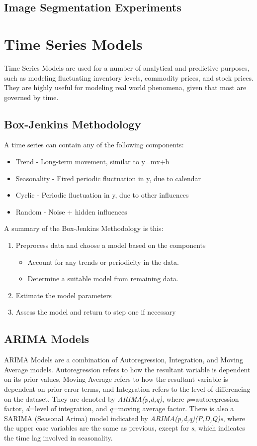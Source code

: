 \documentclass[12pt]{article}
\begin{document}
\subsection {Image Segmentation Experiments}

\pagebreak

\section {Time Series Models}
  Time Series Models are used for a number of analytical and predictive purposes, such as modeling fluctuating inventory levels, commodity prices, and stock prices. They are highly useful for modeling real world phenomena, given that most are governed by time. \cite{wiki-ts}

\subsection {Box-Jenkins Methodology}
  A time series can contain any of the following components:
  \begin{itemize}
    \item Trend - Long-term movement, similar to y=mx+b
    \item Seasonality - Fixed periodic fluctuation in y, due to calendar
    \item Cyclic - Periodic fluctuation in y, due to other influences
    \item Random - Noise + hidden influences
  \end{itemize}
  A summary of the Box-Jenkins Methodology is this:
  \begin{enumerate}
    \item Preprocess data and choose a model based on the components
    \begin{itemize}
      \item Account for any trends or periodicity in the data.
      \item Determine a suitable model from remaining data.
    \end{itemize}
    \item Estimate the model parameters
    \item Assess the model and return to step one if necessary
  \end{enumerate}

\subsection {ARIMA Models}
  ARIMA Models are a combination of Autoregression, Integration, and Moving Average models. Autoregression refers to how the resultant variable is dependent on its prior values, Moving Average refers to how the resultant variable is dependent on prior error terms, and Integration refers to the level of differencing on the dataset. They are denoted by \textit{ARIMA(p,d,q)}, where \textit{p}=autoregression factor, \textit{d}=level of integration, and \textit{q}=moving average factor. There is also a SARIMA (Seasonal Arima) model indicated by \textit{ARIMA(p,d,q)(P,D,Q)s}, where the upper case variables are the same as previous, except for \textit{s}, which indicates the time lag involved in seasonality.
\end{document}
